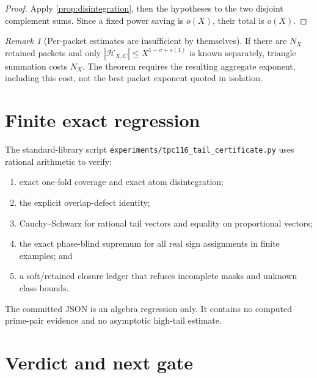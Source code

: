 \documentclass[11pt]{article}
\theoremstyle{definition}
\theoremstyle{remark}
\newtheorem{remark}[theorem]{Remark}
\begin{document}
\begin{proof}
Apply \cref{prop:disintegration}, then the hypotheses to the two
disjoint complement sums.  Since a fixed power saving is \(o(X)\),
their total is \(o(X)\).
\end{proof}

\begin{remark}[Per-packet estimates are insufficient by themselves]
If there are \(N_X\) retained packets and only
\(|\mathcal H_{X,C}|\le X^{1-\sigma+o(1)}\) is known separately,
triangle summation costs \(N_X\).  The theorem requires the resulting
aggregate exponent, including this cost, not the best packet
exponent quoted in isolation.
\end{remark}

\section{Finite exact regression}

The standard-library script
\texttt{experiments/tpc116\_tail\_certificate.py} uses rational
arithmetic to verify:
\begin{enumerate}[leftmargin=2em]
\item exact one-fold coverage and exact atom disintegration;
\item the explicit overlap-defect identity;
\item Cauchy--Schwarz for rational tail vectors and equality on
  proportional vectors;
\item the exact phase-blind supremum for all real sign assignments
  in finite examples; and
\item a soft/retained closure ledger that refuses incomplete masks
  and unknown class bounds.
\end{enumerate}
The committed JSON is an algebra regression only.  It contains no
computed prime-pair evidence and no asymptotic high-tail estimate.

\section{Verdict and next gate}
\end{document}
